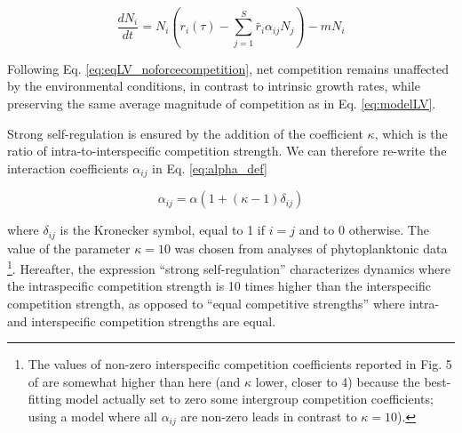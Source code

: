 \documentclass[a4paper,12pt]{article}
\begin{document}
\begin{equation}
\frac{dN_{i}}{dt}=N_{i}\left(r_{i}(\tau)-\sum_{j=1}^{S}\bar{r}_{i}\alpha_{ij}N_{j}\right)-mN_{i}\label{eq:eqLV_noforcecompetition}
\end{equation}

Following Eq. \ref{eq:eqLV_noforcecompetition}, net competition remains
unaffected by the environmental conditions, in contrast to intrinsic
growth rates, while preserving the same average magnitude of competition
as in Eq. \ref{eq:modelLV}.

Strong self-regulation is ensured by the addition of the coefficient
$\kappa$, which is the ratio of intra-to-interspecific competition
strength. We can therefore re-write the interaction coefficients $\alpha_{ij}$
in Eq. \ref{eq:alpha_def}

\begin{equation}
\alpha_{ij}=\alpha\left(1+(\kappa-1)\delta_{ij}\right)\label{eq:alpha_def}
\end{equation}

where $\delta_{ij}$ is the Kronecker symbol, equal to 1 if $i=j$
and to 0 otherwise. The value of the parameter $\kappa=10$ was chosen
from analyses of phytoplanktonic data \citep{barraquand2018coastal}\footnote{The values of non-zero interspecific competition coefficients reported in Fig. 5 of \citet{barraquand2018coastal} are somewhat higher than here (and $\kappa$ lower, closer to 4) because the best-fitting model actually set to zero some intergroup competition coefficients; using a model where all $\alpha_{ij}$ are non-zero leads in contrast to $\kappa=10$). }. Hereafter, the expression ``strong self-regulation'' characterizes
dynamics where the intraspecific competition strength is 10 times
higher than the interspecific competition strength, as opposed to
``equal competitive strengths'' where intra- and interspecific competition
strengths are equal.
\end{document}
